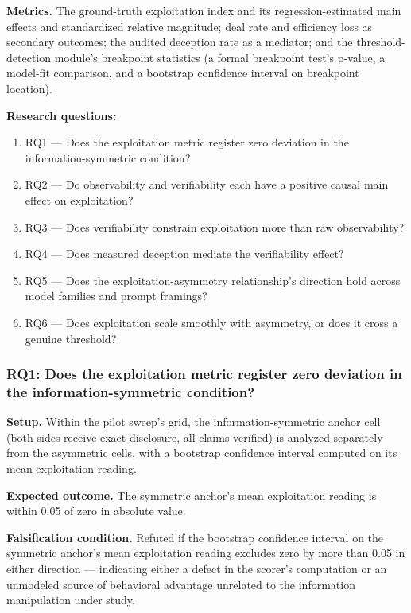 \documentclass[11pt]{article}
\begin{document}
\textbf{Metrics.} The ground-truth exploitation index and its regression-estimated main effects and standardized relative magnitude; deal rate and efficiency loss as secondary outcomes; the audited deception rate as a mediator; and the threshold-detection module's breakpoint statistics (a formal breakpoint test's p-value, a model-fit comparison, and a bootstrap confidence interval on breakpoint location).

\textbf{Research questions:}
\begin{enumerate}[leftmargin=1.6em]
\item RQ1 --- Does the exploitation metric register zero deviation in the information-symmetric condition?
\item RQ2 --- Do observability and verifiability each have a positive causal main effect on exploitation?
\item RQ3 --- Does verifiability constrain exploitation more than raw observability?
\item RQ4 --- Does measured deception mediate the verifiability effect?
\item RQ5 --- Does the exploitation-asymmetry relationship's direction hold across model families and prompt framings?
\item RQ6 --- Does exploitation scale smoothly with asymmetry, or does it cross a genuine threshold?
\end{enumerate}

\subsubsection{RQ1: Does the exploitation metric register zero deviation in the information-symmetric condition?}
\textbf{Setup.} Within the pilot sweep's grid, the information-symmetric anchor cell (both sides receive exact disclosure, all claims verified) is analyzed separately from the asymmetric cells, with a bootstrap confidence interval computed on its mean exploitation reading.

\textbf{Expected outcome.} The symmetric anchor's mean exploitation reading is within 0.05 of zero in absolute value.

\textbf{Falsification condition.} Refuted if the bootstrap confidence interval on the symmetric anchor's mean exploitation reading excludes zero by more than 0.05 in either direction --- indicating either a defect in the scorer's computation or an unmodeled source of behavioral advantage unrelated to the information manipulation under study.
\end{document}
